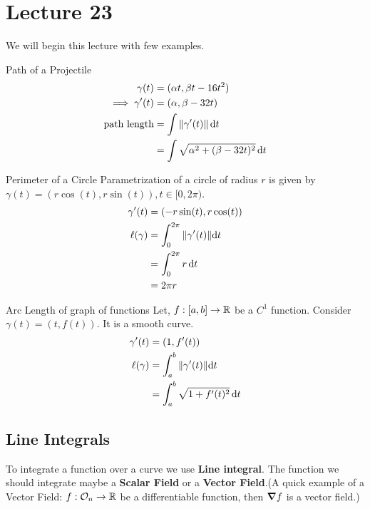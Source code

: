 \documentclass[../Analysis-3.tex]{subfiles}
\begin{document}
\chapter*{Lecture 23} %
\setcounter{chapter}{23} %
\setcounter{section}{0}
\setcounter{equation}{0}
\setcounter{figure}{0}


We will begin this lecture with few examples.
\begin{Eg}{Path of a Projectile}{}
  \begin{align*}
    \gamma(t)           & =(\alpha t, \beta t-16t^2)                     \\
    \implies \gamma'(t) & = (\alpha, \beta -32t)                         \\
    \text{path length}  & = \int \norm{\gamma'(t)}\dd{t}                 \\
                        & = \int \sqrt{\alpha^2 +(\beta-32t)^2} \, \dd t
  \end{align*}
\end{Eg}

\begin{Eg}{Perimeter of a Circle}{}
  Parametrization of a circle of radius $r$ is given by $\gamma(t) = (r\cos(t),r\sin(t)), t \in [0,2\pi)$.
  \begin{align*}
    \gamma'(t)    & = (-r\sin(t),r\cos(t))                    \\
    \ell (\gamma) & = \int_{0}^{2\pi} \norm{\gamma'(t)} \dd t \\
                  & = \int_{0}^{2\pi} r \, \dd t              \\
                  & = 2\pi r
  \end{align*}
\end{Eg}

\begin{Eg}{Arc Length of graph of functions}{}
  Let, $f : [a,b]\to \mathbb{R}$ be a $C^1$ function. Consider $\gamma(t)=(t, f(t))$. It is a smooth curve.
  \begin{align*}
    \gamma'(t)    & = (1,f'(t))                                \\
    \ell (\gamma) & = \int_{a}^{b} \norm{\gamma'(t)} \dd t     \\
                  & = \int_{a}^{b} \sqrt{1 + f'(t)^2} \, \dd t
  \end{align*}
\end{Eg}

\section{Line Integrals}
To integrate a function over a curve we use \textbf{Line integral}. The function we should integrate maybe a \textbf{Scalar Field} or a \textbf{Vector Field}.(A quick example of a Vector Field: $f : \mathcal{O}_{n} \to \mathbb{R}$ be a differentiable function, then $\grad f$ is a vector field.)
\end{document}
